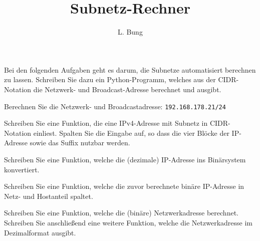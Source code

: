 \documentclass[11pt, a4paper, oneside]{article}
\begin{document}
	\author{L. Bung}
	\title{Subnetz-Rechner}
	\subject{ITS}
	\maketitle
	
	Bei den folgenden Aufgaben geht es darum, die Subnetze automatisiert berechnen zu lassen.
	Schreiben Sie dazu ein Python-Programm, welches aus der CIDR-Notation die Netzwerk- und Broadcast-Adresse berechnet und ausgibt.
	
	
	Berechnen Sie die Netzwerk- und Broadcastadresse: \texttt{192.168.178.21/24}
	
	\boxarea[7cm]
	
	
	Schreiben Sie eine Funktion, die eine IPv4-Adresse mit Subnetz in CIDR-Notation einliest.
	Spalten Sie die Eingabe auf, so dass die vier Blöcke der IP-Adresse sowie das Suffix nutzbar werden.
	
	
	
	Schreiben Sie eine Funktion, welche die (dezimale) IP-Adresse ins Binärsystem konvertiert.
	
	
	
	Schreiben Sie eine Funktion, welche die zuvor berechnete binäre IP-Adresse in Netz- und Hostanteil spaltet.
	
	
	Schreiben Sie eine Funktion, welche die (binäre) Netzwerkadresse berechnet.
	Schreiben Sie anschließend eine weitere Funktion, welche die Netzwerkadresse im Dezimalformat ausgibt.
	
	
	
\end{document}
